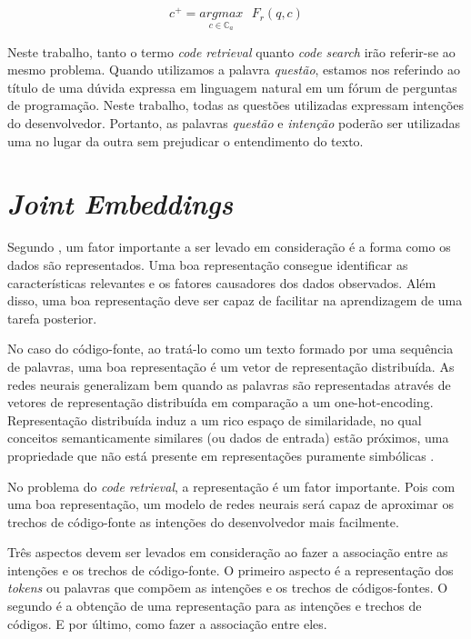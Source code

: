 \begin{equation}\label{eq:code-retrieval}
c^{+} = \underset{c \in \mathbb{C}_{a}}{argmax}\text{ } F_{r}(q , c)
\end{equation}

Neste trabalho, tanto o termo \textit{code retrieval} quanto \textit{code search} irão referir-se ao mesmo problema. Quando utilizamos a palavra \emph{questão}, estamos nos referindo ao título de uma dúvida expressa em linguagem natural em um fórum de perguntas de programação. Neste trabalho, todas as questões utilizadas expressam intenções do desenvolvedor. Portanto, as palavras \emph{questão} e \emph{intenção} poderão ser utilizadas uma no lugar da outra sem prejudicar o entendimento do texto.



\section{\textit{Joint Embeddings}}

Segundo \cite{Goodfellow-et-al-2016:representation-learning}, um fator importante a ser levado em consideração é a forma como os dados são representados. Uma boa representação consegue identificar as características relevantes e os fatores causadores dos dados observados. Além disso, uma boa representação deve ser capaz de facilitar na aprendizagem de uma tarefa posterior.

No caso do código-fonte, ao tratá-lo como um texto formado por uma sequência de palavras, uma boa representação é um vetor de representação distribuída. As redes neurais generalizam bem quando as palavras são representadas através de vetores de representação distribuída em comparação a um \gls{one-hot-encoding}. Representação distribuída induz a um rico espaço de similaridade, no qual conceitos semanticamente similares (ou dados de entrada) estão próximos, uma propriedade que não está presente em representações puramente simbólicas \citep{Goodfellow-et-al-2016:representation-learning}.

No problema do \textit{code retrieval}, a representação é um fator importante. Pois com uma boa representação, um modelo de redes neurais será capaz de aproximar os trechos de código-fonte as intenções do desenvolvedor mais facilmente. 

Três aspectos devem ser levados em consideração ao fazer a associação entre as intenções e os trechos de código-fonte. O primeiro aspecto é a representação dos \textit{tokens} ou palavras que compõem as intenções e os trechos de códigos-fontes. O segundo é a obtenção de uma representação para as intenções e trechos de códigos. E por último, como fazer a associação entre eles.

